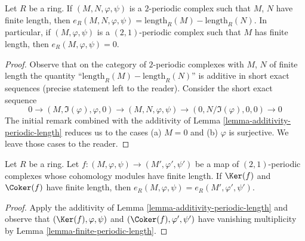 \begin{lemma}
\label{lemma-finite-periodic-length}
Let $R$ be a ring. If $(M, N, \varphi, \psi)$ is a $2$-periodic complex
such that $M$, $N$ have finite length, then
$e_R(M, N, \varphi, \psi) = \text{length}_R(M) - \text{length}_R(N)$.
In particular, if $(M, \varphi, \psi)$ is a $(2, 1)$-periodic complex
such that $M$ has finite length, then
$e_R(M, \varphi, \psi) = 0$.
\end{lemma}

\begin{proof}
Observe that on the category of $2$-periodic complexes with $M$, $N$
of finite length the quantity ``$\text{length}_R(M) - \text{length}_R(N)$''
is additive in short exact sequences (precise statement left to the reader).
Consider the short exact sequence
$$
0 \to (M, \Im(\varphi), \varphi, 0) \to
(M, N, \varphi, \psi) \to (0, N/\Im(\varphi), 0, 0) \to 0
$$
The initial remark combined with the additivity of
Lemma \ref{lemma-additivity-periodic-length}
reduces us to the cases (a) $M = 0$ and (b) $\varphi$ is surjective.
We leave those cases to the reader.
\end{proof}

\begin{lemma}
\label{lemma-compare-periodic-lengths}
Let $R$ be a ring. Let $f : (M, \varphi, \psi) \to (M', \varphi', \psi')$
be a map of $(2, 1)$-periodic complexes whose cohomology modules
have finite length. If $\Ker(f)$ and $\Coker(f)$ have finite length,
then $e_R(M, \varphi, \psi) = e_R(M', \varphi', \psi')$.
\end{lemma}

\begin{proof}
Apply the additivity of Lemma \ref{lemma-additivity-periodic-length}
and observe that $(\Ker(f), \varphi, \psi)$ and
$(\Coker(f), \varphi', \psi')$ have vanishing multiplicity by
Lemma \ref{lemma-finite-periodic-length}.
\end{proof}





